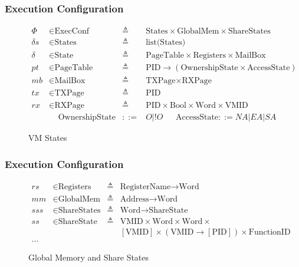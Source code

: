 \documentclass{beamer}
\newcommand*{\defined}{\triangleq}
\newcommand*{\maps}{\rightarrow}
\newcommand*{\derived}{::=}
\newcommand*{\CONF}{\text{ExecConf}}
\newcommand*{\STATE}{\text{State}}
\newcommand*{\MEM}{\text{GlobalMem}}
\newcommand*{\SSS}{\text{ShareStates}}
\newcommand*{\PID}{\text{PID}}
\newcommand*{\PT}{\text{PageTable}}
\newcommand*{\AS}{\text{AccessState}}
\newcommand*{\OS}{\text{OwnershipState}}
\newcommand*{\REGS}{\text{Registers}}
\newcommand*{\ADDR}{\text{Address}}
\newcommand*{\WORD}{\text{Word}}
\newcommand*{\VMID}{\text{VMID}}
\newcommand*{\REGNAMES}{\text{RegisterName}}
\newcommand*{\MB}{\text{MailBox}}
\begin{document}
\begin{frame}
  \frametitle{Execution Configuration}
\begin{figure}
  \begin{align*}
    \Phi &\in \CONF &\defined &\text{States} \times \MEM \times \SSS \\
    \delta s &\in \text{States} &\defined &\text{list(States)} \\
    \delta &\in \STATE &\defined &\PT \times \REGS \times \MB \\
    pt & \in \PT & \defined & \PID \maps (\OS \times \AS) \\
    mb & \in \MB &\defined &\text{TXPage} \times  \text{RXPage}\\
    tx & \in \text{TXPage} &\defined &\PID\\
    rx & \in \text{RXPage} &\defined &\PID \times \text{Bool} \times \WORD \times \VMID \\
      & \;\;\;\; \OS & \derived & O | !O  ~~~~~~~  \AS  \derived  NA | EA | SA
  \end{align*}
  \caption{VM States}
\end{figure}

\end{frame}

\begin{frame}
  \frametitle{Execution Configuration}
\begin{figure}
  \begin{align*}
      rs & \in \REGS &\defined  &\REGNAMES \maps \WORD \\
    mm & \in \MEM &\defined  &\ADDR \maps \WORD \\
    sss & \in \SSS &\defined  &\WORD \maps \text{ShareState} \\
    ss & \in \text{ShareState} &\defined &\VMID \times \WORD \times \WORD \times\\
         &&&   [\VMID] \times (\VMID \maps [\PID]) \times \text{FunctionID}\\
    ...
  \end{align*}
  \caption{Global Memory and Share States}
\end{figure}

\end{frame}
\end{document}
